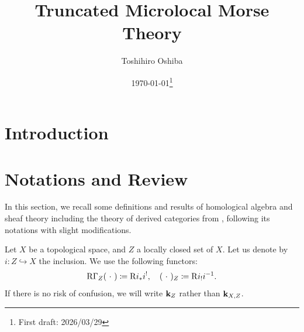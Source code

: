 \newcommand{\cotn}[1][]{\dot{T}^{\ast}{#1}}


\newcommand{\muhom}{\mu hom}
\newcommand{\muHom}[1][]{\mathrm{Hom}^\mu_{\raise1.5ex\hbox to.1em{}#1}}

\newcommand{\mucat}[2][]{\mathsf{D}^{\mathrm{b}}_{#1}(#2)}

\newcommand{\conv}[1][]{\mathbin{\mathop{\circ}\limits_{#1}}}


\newcommand{\lopen}{\left]}
\newcommand{\lclosed}{\left[}
\newcommand{\ropen}{\right[}
\newcommand{\rclosed}{\right]}

\newcommand{\sm}{\raisebox{2.33pt}{~\rule{6.4pt}{1.3pt}~}}
\newcommand{\smi}{\smallsetminus}

\newcommand{\smid}{\mathrel{;}}

\newcommand{\Sol}[2][]{\mathop{\mathcal{S}ol}\nolimits_{#1}(#2)}
\newcommand{\Char}{\mathop{\mathrm{Char}}\nolimits}



\title{Truncated Microlocal Morse Theory}
\author{Toshihiro Oshiba}
\date{\today\footnote{First draft: 2026/03/29}}

\maketitle

\tableofcontents

\section{Introduction}\label{sec:intro}
%



\section{Notations and Review}\label{sec:review}

In this section, 
we recall some definitions and results of 
homological algebra and sheaf theory including 
the theory of derived categories from \cite{KS90}, 
following its notations with slight modifications. 

Let \(X\) be a topological space, 
and \(Z\) a locally closed set of \(X\). 
Let us denote by \(i\colon Z\hookrightarrow X\) the inclusion. 
We use the following functors: 
\[
  \RG_{Z}(\blk) \coloneqq \Rder[]{i_{\ast}}i^{!}, 
  \quad
  (\blk)_{Z}\coloneqq \Rder[]{i_{!}}i^{-1}.
\]
If there is no risk of confusion, 
we will write \(\kk_Z\) rather than \(\kk_{X,Z}\).

